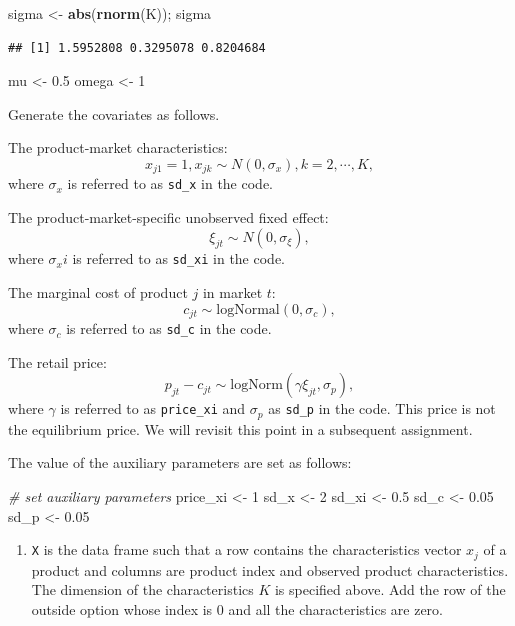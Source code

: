 \documentclass[]{book}
\newenvironment{Shaded}{\begin{snugshade}}{\end{snugshade}}
\newcommand{\KeywordTok}[1]{\textcolor[rgb]{0.13,0.29,0.53}{\textbf{#1}}}
\newcommand{\DecValTok}[1]{\textcolor[rgb]{0.00,0.00,0.81}{#1}}
\newcommand{\FloatTok}[1]{\textcolor[rgb]{0.00,0.00,0.81}{#1}}
\newcommand{\StringTok}[1]{\textcolor[rgb]{0.31,0.60,0.02}{#1}}
\newcommand{\CommentTok}[1]{\textcolor[rgb]{0.56,0.35,0.01}{\textit{#1}}}
\newcommand{\NormalTok}[1]{#1}
\providecommand{\tightlist}{%
  \setlength{\itemsep}{0pt}\setlength{\parskip}{0pt}}
\begin{document}
\begin{Shaded}
\begin{Highlighting}[]
\NormalTok{sigma <-}\StringTok{ }\KeywordTok{abs}\NormalTok{(}\KeywordTok{rnorm}\NormalTok{(K)); sigma}
\end{Highlighting}
\end{Shaded}

\begin{verbatim}
## [1] 1.5952808 0.3295078 0.8204684
\end{verbatim}

\begin{Shaded}
\begin{Highlighting}[]
\NormalTok{mu <-}\StringTok{ }\FloatTok{0.5}
\NormalTok{omega <-}\StringTok{ }\DecValTok{1}
\end{Highlighting}
\end{Shaded}

Generate the covariates as follows.

The product-market characteristics: \[
x_{j1} = 1, x_{jk} \sim N(0, \sigma_x), k = 2, \cdots, K,
\] where \(\sigma_x\) is referred to as \texttt{sd\_x} in the code.

The product-market-specific unobserved fixed effect: \[
\xi_{jt} \sim N(0, \sigma_\xi),
\] where \(\sigma_xi\) is referred to as \texttt{sd\_xi} in the code.

The marginal cost of product \(j\) in market \(t\): \[
c_{jt} \sim \text{logNormal}(0, \sigma_c),
\] where \(\sigma_c\) is referred to as \texttt{sd\_c} in the code.

The retail price: \[
p_{jt} - c_{jt} \sim \text{logNorm}(\gamma \xi_{jt}, \sigma_p),
\] where \(\gamma\) is referred to as \texttt{price\_xi} and
\(\sigma_p\) as \texttt{sd\_p} in the code. This price is not the
equilibrium price. We will revisit this point in a subsequent
assignment.

The value of the auxiliary parameters are set as follows:

\begin{Shaded}
\begin{Highlighting}[]
\CommentTok{# set auxiliary parameters}
\NormalTok{price_xi <-}\StringTok{ }\DecValTok{1}
\NormalTok{sd_x <-}\StringTok{ }\DecValTok{2}
\NormalTok{sd_xi <-}\StringTok{ }\FloatTok{0.5}
\NormalTok{sd_c <-}\StringTok{ }\FloatTok{0.05}
\NormalTok{sd_p <-}\StringTok{ }\FloatTok{0.05}
\end{Highlighting}
\end{Shaded}

\begin{enumerate}
\def\labelenumi{\arabic{enumi}.}
\setcounter{enumi}{1}
\tightlist
\item
  \texttt{X} is the data frame such that a row contains the
  characteristics vector \(x_{j}\) of a product and columns are product
  index and observed product characteristics. The dimension of the
  characteristics \(K\) is specified above. Add the row of the outside
  option whose index is \(0\) and all the characteristics are zero.
\end{enumerate}
\end{document}
